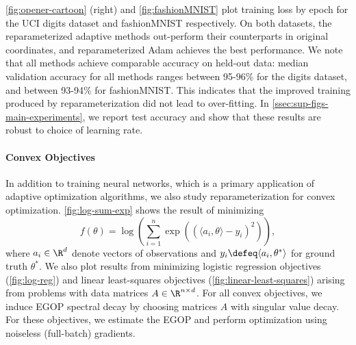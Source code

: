 \documentclass{article}
\begin{document}
\cref{fig:opener-cartoon} (right) and \cref{fig:fashionMNIST} plot training loss by epoch for the UCI digits dataset and fashionMNIST respectively. On both datasets, the reparameterized adaptive methods out-perform their counterparts in original coordinates, and reparameterized Adam achieves the best performance. We note that all methods achieve comparable accuracy on held-out data: median validation accuracy for all methods ranges between 95-96\% for the digits dataset, and between 93-94\% for fashionMNIST. This indicates that the improved training produced by reparameterization did not lead to over-fitting. In \cref{ssec:sup-figs-main-experiments}, we report test accuracy and show that these results are robust to choice of learning rate.

\paragraph{Convex Objectives} In addition to training neural networks, which is a primary application of adaptive optimization algorithms, we also study reparameterization for convex optimization. \cref{fig:log-sum-exp} shows the result of minimizing
\begin{equation}\label{eq:log-sum-exp-objective}
    f(\theta) = \log\left(\sum_{i=1}^n\exp\left((\langle a_i, \theta\rangle -y_i)^2\right)\right),
\end{equation}
where $a_i\in \R^d$ denote vectors of observations and $y_i \defeq \langle a_i, \theta^*\rangle$ for ground truth $\theta^*$. We also plot results from minimizing logistic regression objectives (\cref{fig:log-reg}) and linear least-squares objectives (\cref{fig:linear-least-squares}) arising from problems with data matrices $A\in \R^{n\times d}$. For all convex objectives, we induce EGOP spectral decay by choosing matrices $A$ with singular value decay. For these objectives, we estimate the EGOP and perform optimization using noiseless (full-batch) gradients. %
\end{document}
